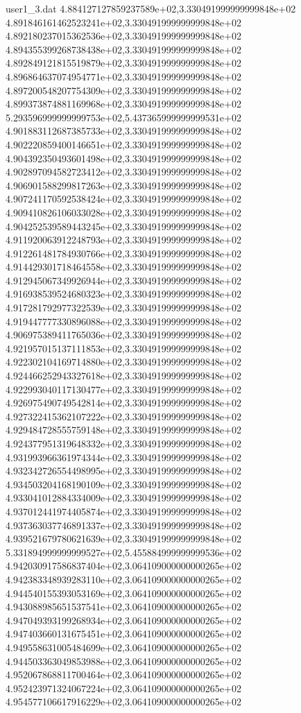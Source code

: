\begin{filecontents}{user1_3.dat}
4.884127127859237589e+02,3.330491999999999848e+02
4.891846161462523241e+02,3.330491999999999848e+02
4.892180237015362536e+02,3.330491999999999848e+02
4.894355399268738438e+02,3.330491999999999848e+02
4.892849121815519879e+02,3.330491999999999848e+02
4.896864637074954771e+02,3.330491999999999848e+02
4.897200548207754309e+02,3.330491999999999848e+02
4.899373874881169968e+02,3.330491999999999848e+02
5.293596999999999753e+02,5.437365999999999531e+02
4.901883112687385733e+02,3.330491999999999848e+02
4.902220859400146651e+02,3.330491999999999848e+02
4.904392350493601498e+02,3.330491999999999848e+02
4.902897094582723412e+02,3.330491999999999848e+02
4.906901588299817263e+02,3.330491999999999848e+02
4.907241170592538424e+02,3.330491999999999848e+02
4.909410826106033028e+02,3.330491999999999848e+02
4.904252539589443245e+02,3.330491999999999848e+02
4.911920063912248793e+02,3.330491999999999848e+02
4.912261481784930766e+02,3.330491999999999848e+02
4.914429301718464558e+02,3.330491999999999848e+02
4.912945067349926944e+02,3.330491999999999848e+02
4.916938539524680323e+02,3.330491999999999848e+02
4.917281792977322539e+02,3.330491999999999848e+02
4.919447777330896088e+02,3.330491999999999848e+02
4.906975389411765036e+02,3.330491999999999848e+02
4.921957015137111853e+02,3.330491999999999848e+02
4.922302104169714880e+02,3.330491999999999848e+02
4.924466252943327618e+02,3.330491999999999848e+02
4.922993040117130477e+02,3.330491999999999848e+02
4.926975490749542814e+02,3.330491999999999848e+02
4.927322415362107222e+02,3.330491999999999848e+02
4.929484728555759148e+02,3.330491999999999848e+02
4.924377951319648332e+02,3.330491999999999848e+02
4.931993966361974344e+02,3.330491999999999848e+02
4.932342726554498995e+02,3.330491999999999848e+02
4.934503204168190109e+02,3.330491999999999848e+02
4.933041012884334009e+02,3.330491999999999848e+02
4.937012441974405874e+02,3.330491999999999848e+02
4.937363037746891337e+02,3.330491999999999848e+02
4.939521679780621639e+02,3.330491999999999848e+02
5.331894999999999527e+02,5.455884999999999536e+02
4.942030917586837404e+02,3.064109000000000265e+02
4.942383348939283110e+02,3.064109000000000265e+02
4.944540155393053169e+02,3.064109000000000265e+02
4.943088985651537541e+02,3.064109000000000265e+02
4.947049393199268934e+02,3.064109000000000265e+02
4.947403660131675451e+02,3.064109000000000265e+02
4.949558631005484699e+02,3.064109000000000265e+02
4.944503363049853988e+02,3.064109000000000265e+02
4.952067868811700464e+02,3.064109000000000265e+02
4.952423971324067224e+02,3.064109000000000265e+02
4.954577106617916229e+02,3.064109000000000265e+02

\end{filecontents}
